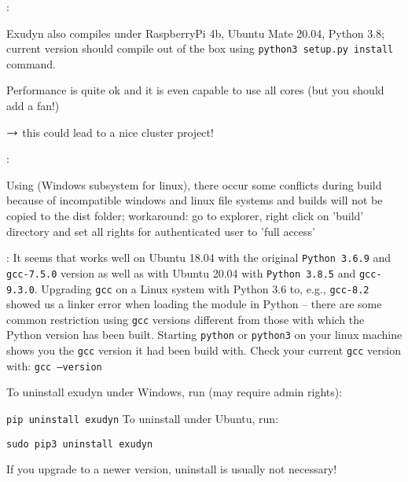 \noindent {}:
\bi
  \item Exudyn also compiles under RaspberryPi 4b, Ubuntu Mate 20.04, Python 3.8; current version should compile out of the box using \texttt{python3 setup.py install} command.
  \item Performance is quite ok and it is even capable to use all cores (but you should add a fan!)
  \item $\rightarrow$ this could lead to a nice cluster project!
\ei

\noindent {}:
\bi
  \item Using  (Windows subsystem for linux), there occur some conflicts during build because of incompatible windows and linux file systems and builds will not be copied to the dist folder; workaround: go to explorer, right click on 'build' directory and set all rights for authenticated user to 'full access'
  \item {}: It seems that \codeName works well on Ubuntu 18.04 with the original \texttt{Python 3.6.9} and \texttt{gcc-7.5.0} version as well as with Ubuntu 20.04 with \texttt{Python 3.8.5} and \texttt{gcc-9.3.0}. Upgrading \texttt{gcc} on a Linux system with Python 3.6 to, e.g., \texttt{gcc-8.2} showed us a linker error when loading the \codeName module in Python -- there are some common restriction using \texttt{gcc} versions different from those with which the Python version has been built. Starting \texttt{python} or \texttt{python3} on your linux machine shows you the \texttt{gcc} version it had been build with. Check your current \texttt{gcc} version with: \texttt{gcc --version}
\ei


To uninstall exudyn under Windows, run (may require admin rights):
\bi
  \item[] \texttt{pip uninstall exudyn}
\ei
\noindent To uninstall under Ubuntu, run:
\bi
  \item[] \texttt{sudo pip3 uninstall exudyn}
\ei

If you upgrade to a newer version, uninstall is usually not necessary!
%


